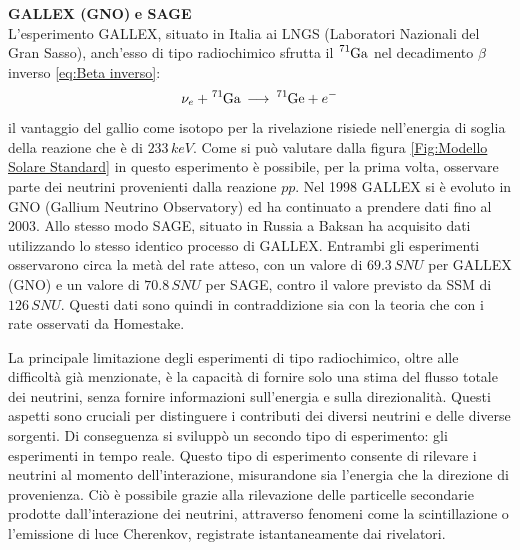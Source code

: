 \textbf{GALLEX (GNO)} \textbf{e SAGE}\\L'esperimento GALLEX, situato in Italia ai LNGS (Laboratori Nazionali del Gran Sasso), anch'esso di tipo radiochimico sfrutta il $\ce{^{71}Ga}$ nel decadimento $\beta$ inverso \ref{eq:Beta inverso}:
\begin{equation}
    \nu_e+\ce{^{71}Ga}\,\longrightarrow\,\ce{^{71}Ge}+e^-
    \label{eq:Gallex}
\end{equation}
il vantaggio del gallio come isotopo per la rivelazione risiede nell'energia di soglia della reazione che è di $233\,\unit{keV}$. Come si può valutare dalla figura \ref{Fig:Modello Solare Standard} in questo esperimento è possibile, per la prima volta, osservare parte dei neutrini provenienti dalla reazione $pp$. Nel 1998 GALLEX si è evoluto in GNO (Gallium Neutrino Observatory) ed ha continuato a prendere dati fino al 2003. Allo stesso modo SAGE, situato in Russia a Baksan ha acquisito dati utilizzando lo stesso identico processo di GALLEX. Entrambi gli esperimenti osservarono circa la metà del rate atteso, con un valore di $69.3\,\unit{SNU}$ per GALLEX (GNO) e un valore di $70.8\,\unit{SNU}$ per SAGE, contro il valore previsto da SSM di $126\,\unit{SNU}$. Questi dati sono quindi in contraddizione sia con la teoria che con i rate osservati da Homestake. 

La principale limitazione degli esperimenti di tipo radiochimico, oltre alle difficoltà già menzionate, è la capacità di fornire solo una stima del flusso totale dei neutrini, senza fornire informazioni sull'energia e sulla direzionalità. Questi aspetti sono cruciali per distinguere i contributi dei diversi neutrini e delle diverse sorgenti. Di conseguenza si sviluppò un secondo tipo di esperimento: gli esperimenti in tempo reale. Questo tipo di esperimento consente di rilevare i neutrini al momento dell'interazione, misurandone sia l'energia che la direzione di provenienza. Ciò è possibile grazie alla rilevazione delle particelle secondarie prodotte dall'interazione dei neutrini, attraverso fenomeni come la scintillazione o l'emissione di luce Cherenkov, registrate istantaneamente dai rivelatori.
\vspace{0,5cm}

